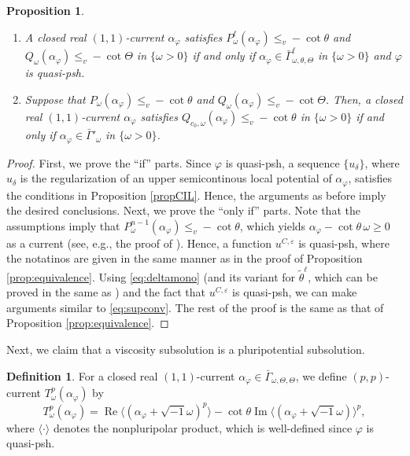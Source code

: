 \documentclass{amsart}
\numberwithin{equation}{section}
\theoremstyle{plain}
\newtheorem{prop}[equation]{Proposition}
\theoremstyle{definition}
\newtheorem{defn}[equation]{Definition}
\theoremstyle{remark}
\begin{document}
\begin{prop}\label{prop:dhymequivalence}
    \begin{enumerate}[label={\upshape(\roman*)}]
        \item A closed real $(1,1)$-current $\alpha_\varphi$  satisfies $P^\ell_\omega(\alpha_\varphi)\le_v -\cot\theta$ and $Q_\omega(\alpha_\varphi)\le_v -\cot\Theta$ in $\{\omega>0\}$ if and only if $\alpha_\varphi\in\bar{\Gamma}^\ell_{\omega,\theta,\Theta}$ in $\{\omega>0\}$ and $\varphi$ is quasi-psh.
        \item Suppose that $P_\omega(\alpha_\varphi)\le_v -\cot\theta$ and $Q_\omega(\alpha_\varphi)\le_v -\cot\Theta$. Then, a closed real $(1,1)$-current $\alpha_\varphi$ satisfies $Q_{c_0,\omega}(\alpha_\varphi)\le_v-\cot\theta$ in $\{\omega>0\}$ if and only if $\alpha_\varphi\in\bar{\Gamma}'_\omega$ in $\{\omega>0\}$.
    \end{enumerate}
\end{prop}

\begin{proof}
     First, we prove the ``if'' parts. 
     Since $\varphi$ is quasi-psh, a sequence $\{u_\delta\}$, where $u_\delta$ is the regularization of an upper semicontinous local potential of $\alpha_\varphi$, satisfies the conditions in Proposition \ref{propCIL}. Hence, the arguments as before imply the desired conclusions.
     Next, we prove the ``only if'' parts. Note that the assumptions imply that $P^{n-1}_{\omega}(\alpha_\varphi)\le_v-\cot\theta$, which yields $\alpha_\varphi-\cot\theta\, \omega\ge0$ as a current (see, e.g., the proof of \cite[Proposition 1.3]{EGZ}). Hence, a function $u^{C,\varepsilon}$ is quasi-psh, where the notatinos are given in the same manner as in the proof of Proposition \ref{prop:equivalence}. Using \eqref{eq:deltamono} (and its variant for $\tilde{\theta}^\ell$, which can be proved in the same as \cite[Lemma 5.1]{CL}) and the fact that $u^{C,\varepsilon}$ is quasi-psh, we can make arguments similar to \eqref{eq:supconv}.
     The rest of the proof is the same as that of Proposition \ref{prop:equivalence}.
\end{proof}

Next, we claim that a viscosity subsolution is a pluripotential subsolution.

\begin{defn}\label{def:dhymllcurrent}
    For a closed real $(1,1)$-current $\alpha_\varphi\in\bar{\Gamma}_{\omega,\Theta,\Theta}$, we define $(p,p)$-current $T^p_\omega(\alpha_\varphi)$ by
    $$T^p_\omega(\alpha_\varphi)=\operatorname{Re}\langle(\alpha_\varphi+\sqrt{-1}\omega)^p\rangle-\cot\theta\operatorname{Im}\langle(\alpha_\varphi+\sqrt{-1}\omega)\rangle^p,$$
    where $\langle\cdot\rangle$ denotes the nonpluripolar product, which is well-defined since $\varphi$ is quasi-psh.
\end{defn}
\end{document}
